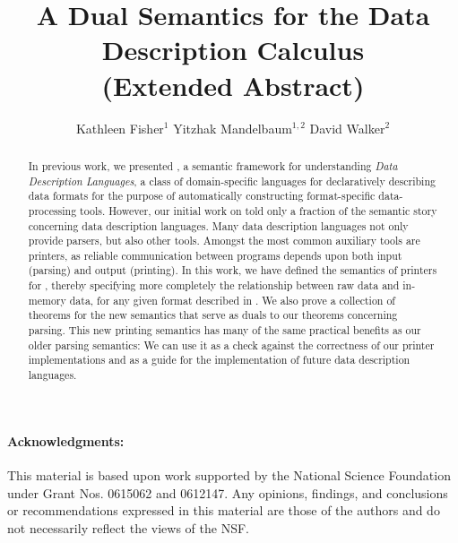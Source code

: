 \documentclass[tfpsymp,ams,pagenumbers]{tfp05symp}
\begin{document}
\title{A Dual Semantics for the Data Description Calculus\\(Extended Abstract)}
\author{Kathleen Fisher$^1$ \qquad Yitzhak Mandelbaum$^{1,2}$ \qquad David Walker$^2$}



\maketitle{}

\begin{abstract}  
  In previous work, we presented \ddc{}, a semantic framework for
  understanding {\em Data Description Languages}, a class of
  domain-specific languages for declaratively describing data formats
  for the purpose of automatically constructing format-specific
  data-processing tools.  However, our initial work on \ddc{} told
  only a fraction of the semantic story concerning data description
  languages.  Many data description languages not only provide
  parsers, but also other tools.  Amongst the most common auxiliary
  tools are printers, as reliable communication between programs
  depends upon both input (parsing) and output (printing).  In this
  work, we have defined the semantics of printers for \ddc{}, thereby
  specifying more completely the relationship between raw data and
  in-memory data, for any given format described in \ddc{}.  We also
  prove a collection of theorems for the new semantics that serve as
  duals to our theorems concerning parsing.  This new printing
  semantics has many of the same practical benefits as our older
  parsing semantics: We can use it as a check against the correctness
  of our printer implementations and as a guide for the implementation
  of future data description languages.
\end{abstract}









\paragraph*{Acknowledgments:} This material is based upon work supported by the National Science
   Foundation under Grant Nos. 0615062 and 0612147.
Any opinions, findings, and conclusions or recommendations
   expressed in this material are those of the authors and do not
   necessarily reflect the views of the NSF.

% 
% 


   
%
\end{document}

